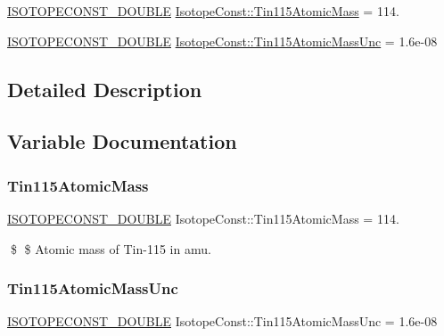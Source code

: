 \begin{DoxyCompactItemize}
\item 
\mbox{\hyperlink{group___isotope_const-_macros_ga8f45a7272ce02c0b4c65c44636ed719a}{I\+S\+O\+T\+O\+P\+E\+C\+O\+N\+S\+T\+\_\+\+D\+O\+U\+B\+LE}} \mbox{\hyperlink{group___isotope_const-_tin-_sn115_gade62a544e0ccbb7bb64ba63ba56f7961}{Isotope\+Const\+::\+Tin115\+Atomic\+Mass}} = 114.
\item 
\mbox{\hyperlink{group___isotope_const-_macros_ga8f45a7272ce02c0b4c65c44636ed719a}{I\+S\+O\+T\+O\+P\+E\+C\+O\+N\+S\+T\+\_\+\+D\+O\+U\+B\+LE}} \mbox{\hyperlink{group___isotope_const-_tin-_sn115_ga0a4a0364a140789f25787ca704963645}{Isotope\+Const\+::\+Tin115\+Atomic\+Mass\+Unc}} = 1.\+6e-\/08
\end{DoxyCompactItemize}


\subsection{Detailed Description}


\subsection{Variable Documentation}
\mbox{\label{group___isotope_const-_tin-_sn115_gade62a544e0ccbb7bb64ba63ba56f7961}} 
\subsubsection{\texorpdfstring{Tin115\+Atomic\+Mass}{Tin115AtomicMass}}
{\footnotesize\ttfamily \mbox{\hyperlink{group___isotope_const-_macros_ga8f45a7272ce02c0b4c65c44636ed719a}{I\+S\+O\+T\+O\+P\+E\+C\+O\+N\+S\+T\+\_\+\+D\+O\+U\+B\+LE}} Isotope\+Const\+::\+Tin115\+Atomic\+Mass = 114.}

\$ \$ Atomic mass of Tin-\/115 in amu. \mbox{\label{group___isotope_const-_tin-_sn115_ga0a4a0364a140789f25787ca704963645}} 
\subsubsection{\texorpdfstring{Tin115\+Atomic\+Mass\+Unc}{Tin115AtomicMassUnc}}
{\footnotesize\ttfamily \mbox{\hyperlink{group___isotope_const-_macros_ga8f45a7272ce02c0b4c65c44636ed719a}{I\+S\+O\+T\+O\+P\+E\+C\+O\+N\+S\+T\+\_\+\+D\+O\+U\+B\+LE}} Isotope\+Const\+::\+Tin115\+Atomic\+Mass\+Unc = 1.\+6e-\/08}

